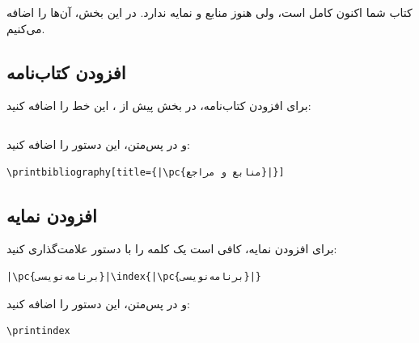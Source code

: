 کتاب شما اکنون کامل است، ولی هنوز منابع و نمایه
ندارد. در این بخش، آن‌ها را اضافه می‌کنیم.

\subsection{افزودن کتاب‌نامه}
\label{sec:first-book-bibliography}

برای افزودن کتاب‌نامه، در بخش پیش از
، این خط را اضافه کنید:

\begin{latin}
\begin{verbatim}

\end{verbatim}
\end{latin}

و در پس‌متن، این دستور را اضافه کنید:

\begin{latin}
\begin{verbatim}
\printbibliography[title={|\pc{منابع و مراجع}|}]
\end{verbatim}
\end{latin}


\subsection{افزودن نمایه}
\label{sec:first-book-index}

برای افزودن نمایه، کافی است یک کلمه را با دستور
 علامت‌گذاری کنید:

\begin{latin}
\begin{verbatim}
|\pc{برنامه‌نویسی}|\index{|\pc{برنامه‌نویسی}|}
\end{verbatim}
\end{latin}


و در پس‌متن، این دستور را اضافه کنید:

\begin{latin}
\begin{verbatim}
\printindex
\end{verbatim}
\end{latin}


